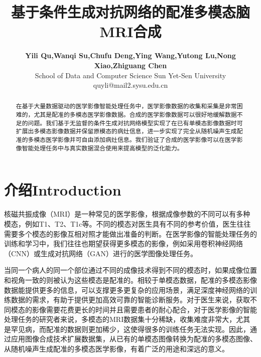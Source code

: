 \documentclass[letterpaper]{article} %
\title{基于条件生成对抗网络的配准多模态脑MRI合成}
\author{\Large \textbf{Yili Qu,Wanqi Su,Chufu Deng,Ying Wang,Yutong Lu,Nong Xiao,Zhiguang Chen}\\ %
School of Data and Computer Science Sun Yet-Sen University\\	
quyli@mail2.sysu.edu.cn%
}
\begin{document}
\maketitle

\begin{abstract}
在基于大量数据驱动的医学影像智能处理任务中，医学影像数据的收集和采集是非常困难的，尤其是配准的多模态医学影像数据。合成的医学影像数据可以很好地缓解数据不足的问题。我们基于无监督的条件生成对抗网络模型实现了在已有单模态影像数据时可扩展出多模态影像数据并保留原模态的病灶信息，进一步实现了完全从随机噪声生成配准的多模态医学影像并可自由添加病灶信息。我们验证了合成的医学影像可以在医学影像智能处理任务中与真实数据混合使用来提高模型的泛化能力。
\end{abstract}
\section{介绍Introduction}
\noindent 
核磁共振成像（MRI）是一种常见的医学影像，根据成像参数的不同可以有多种模态，例如T1、T2、T1c等。不同的模态对医生具有不同的参考价值，医生往往需要多个模态的影像互相对照才能做出准备的判断。在医学影像的智能处理任务的训练和学习中，我们往往也期望获得更多模态的影像，例如采用卷积神经网络（CNN）\cite{86Krizhevsky2012ImageNet}或生成对抗网络（GAN）\cite{25goodfellow2014generative}进行的医学图像处理任务。

当同一个病人的同一个部位通过不同的成像技术得到不同的模态时，如果成像位置和视角一致的则被认为这些模态是配准的。相较于单模态数据，配准的多模态影像数据能提供更多的信息，可以支撑更多更复杂的应用场景，满足深度神经网络的训练数据的需求，有助于提供更加高效可靠的智能诊断服务。对于医生来说，获取不同模态的影像需要花费更长的时间并且需要患者的耐心配合，对于医学影像的智能处理任务的研究者来说，多模态的MRI数据集十分稀缺，收集难度非常大，尤其是罕见病，而配准的数据则更加稀少，这使得很多的训练任务无法实现。因此，通过应用图像合成技术扩展数据集，从已有的单模态图像转换为配准的多模态图像、从随机噪声生成配准的多模态医学影像，有着广泛的用途和深远的意义。
\end{document}
